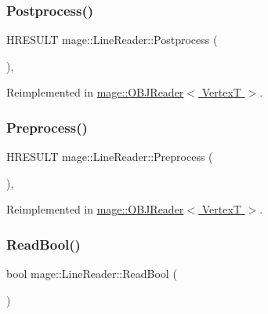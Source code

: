 \hypertarget{classmage_1_1_line_reader_a4c8f2e1a60c6f3c98b4b47f3019c24f3}{}\label{classmage_1_1_line_reader_a4c8f2e1a60c6f3c98b4b47f3019c24f3} 
\subsubsection{\texorpdfstring{Postprocess()}{Postprocess()}}
{\footnotesize\ttfamily H\+R\+E\+S\+U\+LT mage\+::\+Line\+Reader\+::\+Postprocess (\begin{DoxyParamCaption}{ }\end{DoxyParamCaption})\hspace{0.3cm}{\ttfamily [protected]}, {\ttfamily [virtual]}}



Reimplemented in \hyperlink{classmage_1_1_o_b_j_reader_a99bc512fd79fb46a688869db6edf5704}{mage\+::\+O\+B\+J\+Reader$<$ Vertex\+T $>$}.

\hypertarget{classmage_1_1_line_reader_a9a67c9527f499f19489f0680caa66ac9}{}\label{classmage_1_1_line_reader_a9a67c9527f499f19489f0680caa66ac9} 
\subsubsection{\texorpdfstring{Preprocess()}{Preprocess()}}
{\footnotesize\ttfamily H\+R\+E\+S\+U\+LT mage\+::\+Line\+Reader\+::\+Preprocess (\begin{DoxyParamCaption}{ }\end{DoxyParamCaption})\hspace{0.3cm}{\ttfamily [protected]}, {\ttfamily [virtual]}}



Reimplemented in \hyperlink{classmage_1_1_o_b_j_reader_adf891ce9b0634f10d6698b88ed3f8d16}{mage\+::\+O\+B\+J\+Reader$<$ Vertex\+T $>$}.

\hypertarget{classmage_1_1_line_reader_a86289c358afe9b3bc5c7789bb8a6af95}{}\label{classmage_1_1_line_reader_a86289c358afe9b3bc5c7789bb8a6af95} 
\subsubsection{\texorpdfstring{Read\+Bool()}{ReadBool()}}
{\footnotesize\ttfamily bool mage\+::\+Line\+Reader\+::\+Read\+Bool (\begin{DoxyParamCaption}{ }\end{DoxyParamCaption})\hspace{0.3cm}{\ttfamily [protected]}}

